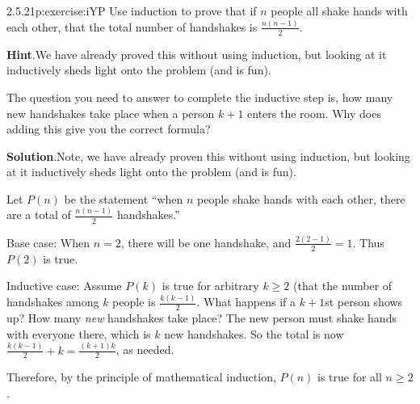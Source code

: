 \documentclass[twoside,11pt,]{book}
\newcommand{\blocktitlefont}{\relax}
\numberwithin{equation}{chapter}
\begin{document}
\begin{divisionsolution}{2.5.21}{}{p:exercise:iYP}%
Use induction to prove that if \(n\) people all shake hands with each other, that the total number of handshakes is \(\frac{n(n-1)}{2}\).%
\par\smallskip%
\noindent\textbf{\blocktitlefont Hint}.\quad{}We have already proved this without using induction, but looking at it inductively sheds light onto the problem (and is fun).%
\par
The question you need to answer to complete the inductive step is, how many new handshakes take place when a person \(k+1\) enters the room.  Why does adding this give you the correct formula?%
\par\smallskip%
\noindent\textbf{\blocktitlefont Solution}.\quad{}Note, we have already proven this without using induction, but looking at it inductively sheds light onto the problem (and is fun).%
\begin{solutionproof}
Let \(P(n)\) be the statement ``when \(n\) people shake hands with each other, there are a total of \(\frac{n(n-1)}{2}\) handshakes.''%
\par
Base case: When \(n=2\), there will be one handshake, and \(\frac{2(2-1)}{2} = 1\). Thus \(P(2)\) is true.%
\par
Inductive case: Assume \(P(k)\) is true for arbitrary \(k\ge 2\) (that the number of handshakes among \(k\) people is \(\frac{k(k-1)}{2}\). What happens if a \(k+1\)st person shows up? How many \emph{new} handshakes take place? The new person must shake hands with everyone there, which is \(k\) new handshakes. So the total is now \(\frac{k(k-1)}{2} + k = \frac{(k+1)k}{2}\), as needed.%
\par
Therefore, by the principle of mathematical induction, \(P(n)\) is true for all \(n \ge 2\).%
\end{solutionproof}
\end{divisionsolution}%
\end{document}
